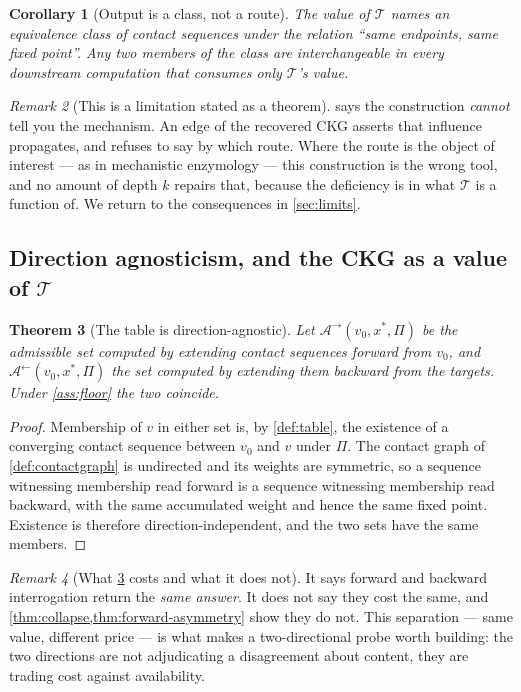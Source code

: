 \documentclass[11pt,twocolumn,a4paper]{article}
\theoremstyle{plain}
\newtheorem{theorem}{Theorem}[section]
\newtheorem{corollary}[theorem]{Corollary}
\theoremstyle{definition}
\theoremstyle{remark}
\newtheorem{remark}[theorem]{Remark}
\newcommand{\Tmap}{\mathcal{T}}
\newcommand{\Adm}{\mathcal{A}}
\begin{document}
\begin{corollary}[Output is a class, not a route]
\label{cor:gauge}
The value of $\Tmap$ names an equivalence class of contact sequences under the
relation ``same endpoints, same fixed point''. Any two members of the class are
interchangeable in every downstream computation that consumes only $\Tmap$'s
value.
\end{corollary}

\begin{remark}[This is a limitation stated as a theorem]
 says the construction \emph{cannot} tell you the mechanism.
An edge of the recovered CKG asserts that influence propagates, and refuses to
say by which route. Where the route is the object of interest --- as in
mechanistic enzymology --- this construction is the wrong tool, and no amount of
depth $k$ repairs that, because the deficiency is in what $\Tmap$ is a function
of. We return to the consequences in \cref{sec:limits}.
\end{remark}

\subsection{Direction agnosticism, and the CKG as a value of \texorpdfstring{$\Tmap$}{T}}

\begin{theorem}[The table is direction-agnostic]
\label{thm:welldefined}
Let $\Adm^{\rightarrow}(v_0,x^*,\Pi)$ be the admissible set computed by
extending contact sequences forward from $v_0$, and
$\Adm^{\leftarrow}(v_0,x^*,\Pi)$ the set computed by extending them backward
from the targets. Under \cref{ass:floor} the two coincide.
\end{theorem}

\begin{proof}
Membership of $v$ in either set is, by \cref{def:table}, the existence of a
converging contact sequence between $v_0$ and $v$ under $\Pi$. The contact
graph of \cref{def:contactgraph} is undirected and its weights are symmetric, so
a sequence witnessing membership read forward is a sequence witnessing
membership read backward, with the same accumulated weight and hence the same
fixed point. Existence is therefore direction-independent, and the two sets have
the same members.
\end{proof}

\begin{remark}[What \cref{thm:welldefined} costs and what it does not]
It says forward and backward interrogation return the \emph{same answer}. It
does not say they cost the same, and \cref{thm:collapse,thm:forward-asymmetry}
show they do not. This separation --- same value, different price --- is what
makes a two-directional probe worth building: the two directions are not
adjudicating a disagreement about content, they are trading cost against
availability.
\end{remark}
\end{document}

